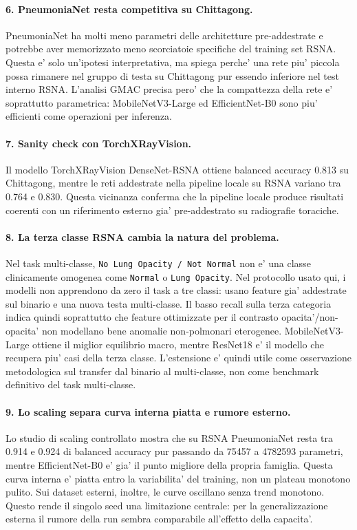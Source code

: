 \documentclass[11pt,a4paper]{article}
\newcommand{\balacc}{balanced accuracy}
\begin{document}
\paragraph{6. PneumoniaNet resta competitiva su Chittagong.}
PneumoniaNet ha molti meno parametri delle architetture pre-addestrate e potrebbe
aver memorizzato meno scorciatoie specifiche del training set RSNA. Questa e'
solo un'ipotesi interpretativa, ma spiega perche' una rete piu' piccola possa
rimanere nel gruppo di testa su Chittagong pur essendo inferiore nel test
interno RSNA. L'analisi GMAC precisa pero' che la compattezza della rete e'
soprattutto parametrica: MobileNetV3-Large ed EfficientNet-B0 sono piu'
efficienti come operazioni per inferenza.

\paragraph{7. Sanity check con TorchXRayVision.}
Il modello TorchXRayVision DenseNet-RSNA ottiene \balacc{} 0.813 su Chittagong,
mentre le reti addestrate nella pipeline locale su RSNA variano tra 0.764 e
0.830. Questa vicinanza conferma che la pipeline locale produce risultati
coerenti con un riferimento esterno gia' pre-addestrato su radiografie toraciche.

\paragraph{8. La terza classe RSNA cambia la natura del problema.}
Nel task multi-classe, \texttt{No Lung Opacity / Not Normal} non e' una classe
clinicamente omogenea come \texttt{Normal} o \texttt{Lung Opacity}. Nel
protocollo usato qui, i modelli non apprendono da zero il task a tre classi:
usano feature gia' addestrate sul binario e una nuova testa multi-classe. Il
basso recall sulla terza categoria indica quindi soprattutto che feature
ottimizzate per il contrasto opacita'/non-opacita' non modellano bene anomalie
non-polmonari eterogenee. MobileNetV3-Large ottiene il miglior equilibrio macro,
mentre ResNet18 e' il modello che recupera piu' casi della terza classe.
L'estensione e' quindi utile come osservazione metodologica sul transfer dal
binario al multi-classe, non come benchmark definitivo del task multi-classe.

\paragraph{9. Lo scaling separa curva interna piatta e rumore esterno.}
Lo studio di scaling controllato mostra che su RSNA PneumoniaNet resta tra 0.914
e 0.924 di \balacc{} pur passando da 75457 a 4782593 parametri, mentre
EfficientNet-B0 e' gia' il punto migliore della propria famiglia. Questa curva
interna e' piatta entro la variabilita' del training, non un plateau monotono
pulito. Sui dataset esterni, inoltre, le curve oscillano senza trend monotono.
Questo rende il singolo seed una limitazione centrale: per la generalizzazione
esterna il rumore della run sembra comparabile all'effetto della capacita'.
\end{document}
